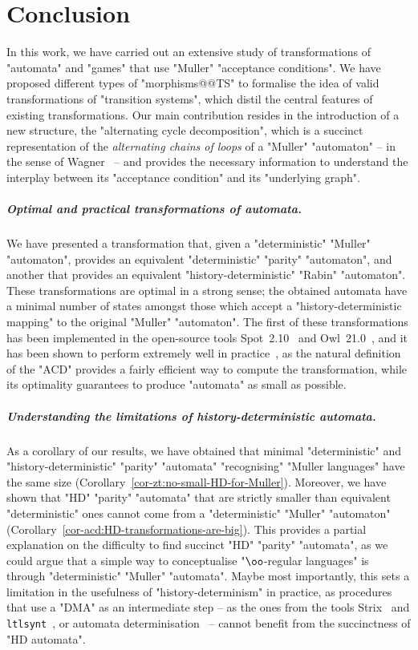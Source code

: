 \documentclass[10pt,a4paper]{amsart}
\begin{document}
 	
	\section{Conclusion}\label{section:conclusion}
	In this work, we have carried out an extensive study of transformations of "automata" and "games" that use "Muller" "acceptance conditions". We have proposed different types of "morphisms@@TS" to formalise the idea of valid transformations of "transition systems", which distil the central features of existing transformations. Our main contribution resides in the introduction of a new structure, the "alternating cycle decomposition", which is a succinct representation of the \emph{alternating chains of loops} of a "Muller" "automaton" -- in the sense of Wagner~\cite{Wagner1979omega} -- and provides the necessary information to understand the interplay between its "acceptance condition" and its "underlying graph".


\subparagraph*{Optimal and practical transformations of automata.} We have presented a transformation that, given a "deterministic" "Muller" "automaton",  provides an equivalent "deterministic" "parity" "automaton", and another that provides an equivalent "history-deterministic" "Rabin" "automaton". These transformations are optimal in a strong sense; the obtained automata have a minimal number of states amongst those which accept a "history-deterministic mapping" to the original "Muller" "automaton".
The first of these transformations has been implemented in the open-source tools Spot~2.10~\cite{Spot2.10CAV22} and Owl~21.0~\cite{KMS18Owl}, and it has been shown to perform extremely well in practice~\cite{CDMRS22Tacas}, as the natural definition of the "ACD" provides a fairly efficient way to compute the transformation, while its optimality guarantees to produce "automata" as small as possible. 


\subparagraph*{Understanding the limitations of history-deterministic automata.} As a corollary of our results, we have obtained that minimal "deterministic" and "history-deterministic" "parity" "automata" "recognising" "Muller languages" have the same size (Corollary~\ref{cor-zt:no-small-HD-for-Muller}). Moreover, we have shown that "HD" "parity" "automata" that are strictly smaller than equivalent "deterministic" ones cannot come from a "deterministic" "Muller" "automaton" (Corollary~\ref{cor-acd:HD-transformations-are-big}). This provides a partial explanation on the difficulty to find succinct "HD" "parity" "automata", as we could argue that a simple way to conceptualise "$\oo$-regular languages" is through "deterministic" "Muller" "automata". 
Maybe most importantly, this sets a limitation in the usefulness of "history-determinism" in practice, as procedures that use a "DMA" as an intermediate step -- as the ones from the tools Strix~\cite{LMS20SynthesisLTL} and \texttt{ltlsynt}~\cite{MichaudColange18Synt}, or  automata determinisation~\cite{Piterman2006fromNDBuchi,Schewe2009tighter,LodingP19} -- cannot benefit from the succinctness of "HD automata".
\end{document}
